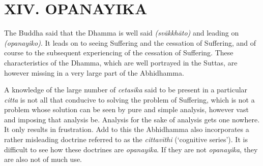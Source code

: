 \section{XIV. OPANAYIKA}

The Buddha said that the Dhamma is well said \emph{(svākkhāto)} and leading on \emph{(opanayiko)}. It leads on to seeing Suffering and the cessation of Suffering, and of course to the subsequent experiencing of the cessation of Suffering. These characteristics of the Dhamma, which are well portrayed in the Suttas, are however missing in a very large part of the Abhidhamma.

A knowledge of the large number of \emph{cetasika} said to be present in a particular \emph{citta} is not all that conducive to solving the problem of Suffering, which is not a problem whose solution can be seen by pure and simple analysis, however vast and imposing that analysis be. Analysis for the sake of analysis gets one nowhere. It only results in frustration. Add to this the Abhidhamma also incorporates a rather misleading doctrine referred to as the \emph{cittavīthi} (`cognitive series'). It is difficult to see how these doctrines are \emph{opanayika}. If they are not \emph{opanayika}, they are also not of much use.
